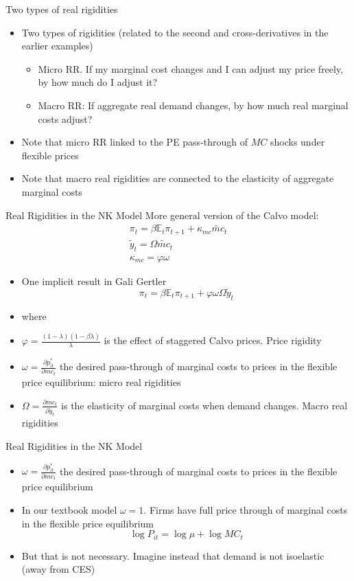\documentclass[11pt,aspectratio=169,xcolor={dvipsnames},hyperref={pdftex,pdfpagemode=UseNone,hidelinks,pdfdisplaydoctitle=true},usepdftitle=false]{beamer}
\begin{document}
\begin{frame}{Two types of real rigidities}
\begin{itemize}
\item Two types of rigidities (related to the second and cross-derivatives in the earlier examples)
\begin{itemize}
\item Micro RR. If my marginal cost changes and I can adjust my price freely, by how much do I adjust it?
\item Macro RR: If aggregate real demand changes, by how much real marginal costs adjust?
\end{itemize}
\item Note that micro RR linked to the PE pass-through of $MC$ shocks under flexible prices 
\item Note that macro real rigidities are connected to the elasticity of aggregate marginal costs
\end{itemize}
\end{frame}


\begin{frame}{Real Rigidities in the NK Model}
More general version of the Calvo model:
\begin{align*}
\pi_t = \beta \mathbb{E}_t \pi_{t+1} + \kappa_{mc} \tilde{mc}_t\\
 \tilde{y}_t = \Omega \tilde{mc}_t\\
  \kappa_{mc} = \varphi \omega
\end{align*}
\begin{itemize}
\item One implicit result in Gali Gertler
$$\pi_t = \beta \mathbb{E}_t \pi_{t+1} + \varphi\omega \Omega \tilde{y}_t$$
\item where
\item $\varphi = \frac{(1-\lambda)(1-\beta \lambda)}{\lambda}$ is the effect of staggered Calvo prices. Price rigidity
\item $\omega = \frac{\partial p_{it}^*}{\partial mc_t}$ the desired pass-through of marginal costs to prices in the flexible price equilibrium: micro real rigidities
\item $\Omega = \frac{\partial mc_{t}}{\partial \tilde{y}_t}$ is the elasticity of marginal costs when demand changes. Macro real rigidities
\end{itemize}
\end{frame}

\begin{frame}{Real Rigidities in the NK Model}
\begin{itemize}
\item $\omega = \frac{\partial p_{it}^*}{\partial mc_t}$ the desired pass-through of marginal costs to prices in the flexible price equilibrium
\item In our textbook model $\omega = 1$. Firms have full price through of marginal costs in the flexible price equilibrium
$$ \log P_{it} = \log \mu + \log MC_{t}$$
\item But that is not necessary. Imagine instead that demand is not isoelastic (away from CES)
\end{itemize}
\end{frame}
\end{document}
